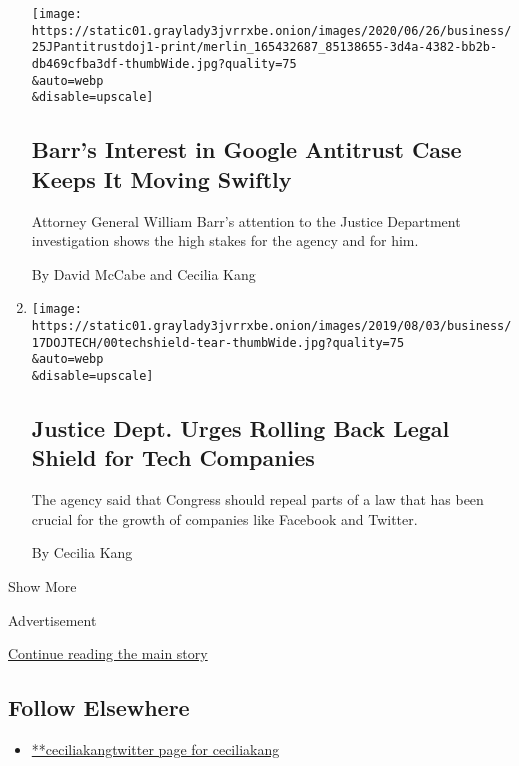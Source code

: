 \begin{enumerate}
  \texttt{[image: https://static01.graylady3jvrrxbe.onion/images/2020/06/26/business/25JPantitrustdoj1-print/merlin\_165432687\_85138655-3d4a-4382-bb2b-db469cfba3df-thumbWide.jpg?quality=75\\\&auto=webp\\\&disable=upscale]}

  \hypertarget{barrs-interest-in-google-antitrust-case-keeps-it-moving-swiftly}{%
  \subsection{Barr's Interest in Google Antitrust Case Keeps It Moving
  Swiftly}\label{barrs-interest-in-google-antitrust-case-keeps-it-moving-swiftly}}

  Attorney General William Barr's attention to the Justice Department
  investigation shows the high stakes for the agency and for him.

  By David McCabe and Cecilia Kang
\item
  \href{/2020/06/17/technology/justice-dept-urges-rolling-back-legal-shield-for-tech-companies.html}{}

  \texttt{[image: https://static01.graylady3jvrrxbe.onion/images/2019/08/03/business/17DOJTECH/00techshield-tear-thumbWide.jpg?quality=75\\\&auto=webp\\\&disable=upscale]}

  \hypertarget{justice-dept-urges-rolling-back-legal-shield-for-tech-companies}{%
  \subsection{Justice Dept. Urges Rolling Back Legal Shield for Tech
  Companies}\label{justice-dept-urges-rolling-back-legal-shield-for-tech-companies}}

  The agency said that Congress should repeal parts of a law that has
  been crucial for the growth of companies like Facebook and Twitter.

  By Cecilia Kang
\end{enumerate}

Show More

Advertisement

\protect\hyperlink{after-mid2}{Continue reading the main story}

\hypertarget{follow-elsewhere}{%
\subsection{Follow Elsewhere}\label{follow-elsewhere}}

\begin{itemize}
\tightlist
\item
  \href{https://twitter.com/ceciliakang}{**ceciliakangtwitter page for
  ceciliakang}
\end{itemize}

